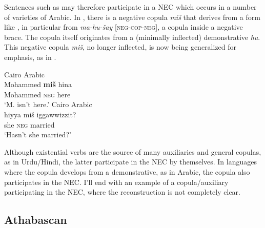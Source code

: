 ﻿\documentclass[output=paper]{langsci/langscibook}
\begin{document}
Sentences such as  may therefore participate in
a NEC which occurs in a number of varieties of Arabic. In
,
there is a negative copula \textit{miš} that derives from a form like
, in particular from \textit{ma-hu-šay}
[\textsc{neg-cop-neg}], a
copula inside a negative brace. The copula itself originates from a
(minimally inflected) demonstrative \textit{hu}. This negative copula
\textit{miš}, no longer inflected, is now being generalized for emphasis,
as in .
%
\begin{exe}\ex Cairo Arabic \label{ex:other-arabic-Mohammed}\\
    \gll Mohammed   \textbf{miš}   hina    \\
    Mohammed  \textsc{neg}  here \\
    \glt `M. isn't here.' \citep[2]{Diem2013}
    \ex Cairo Arabic \label{ex:other-arabic-married}\\
    \gll hiyya   miš  iggawwizzit?     \\
    she  \textsc{neg}  married \\
    \glt `Hasn't she married?’ \citep[341]{Woidich2006}
    \end{exe}

Although existential verbs are the source of many auxiliaries and general
copulas, as in Urdu\slash Hindi, the latter participate in the NEC by
themselves. In languages where the copula develops from a demonstrative, as
in Arabic, the copula also participates in the NEC. I'll end with an
example of a copula\slash auxiliary participating in the NEC, where the
reconstruction is not completely clear.

\subsection{Athabascan}\label{sec:oth-2.4}
\end{document}
